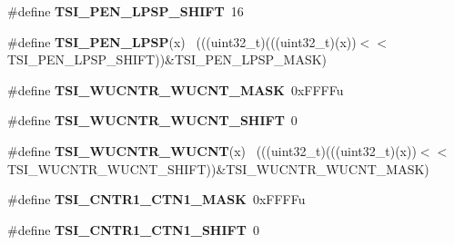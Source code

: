 \begin{DoxyCompactItemize}
\item 
\hypertarget{group___t_s_i___register___masks_ga8a4314c8664c97a0304050452d85779b}{}\#define {\bfseries T\+S\+I\+\_\+\+P\+E\+N\+\_\+\+L\+P\+S\+P\+\_\+\+S\+H\+I\+F\+T}~16\label{group___t_s_i___register___masks_ga8a4314c8664c97a0304050452d85779b}

\item 
\hypertarget{group___t_s_i___register___masks_ga2c49a1ebc890fb8e3d4e7468c516d8fd}{}\#define {\bfseries T\+S\+I\+\_\+\+P\+E\+N\+\_\+\+L\+P\+S\+P}(x)                                                ~(((uint32\+\_\+t)(((uint32\+\_\+t)(x))$<$$<$T\+S\+I\+\_\+\+P\+E\+N\+\_\+\+L\+P\+S\+P\+\_\+\+S\+H\+I\+F\+T))\&T\+S\+I\+\_\+\+P\+E\+N\+\_\+\+L\+P\+S\+P\+\_\+\+M\+A\+S\+K)\label{group___t_s_i___register___masks_ga2c49a1ebc890fb8e3d4e7468c516d8fd}

\item 
\hypertarget{group___t_s_i___register___masks_gaa12e0ab73453118119dc56599e0a5598}{}\#define {\bfseries T\+S\+I\+\_\+\+W\+U\+C\+N\+T\+R\+\_\+\+W\+U\+C\+N\+T\+\_\+\+M\+A\+S\+K}~0x\+F\+F\+F\+Fu\label{group___t_s_i___register___masks_gaa12e0ab73453118119dc56599e0a5598}

\item 
\hypertarget{group___t_s_i___register___masks_gab6de5e2e100b2608c1837b6114fb5117}{}\#define {\bfseries T\+S\+I\+\_\+\+W\+U\+C\+N\+T\+R\+\_\+\+W\+U\+C\+N\+T\+\_\+\+S\+H\+I\+F\+T}~0\label{group___t_s_i___register___masks_gab6de5e2e100b2608c1837b6114fb5117}

\item 
\hypertarget{group___t_s_i___register___masks_gabfa380c87734a1e8d767c8f743906660}{}\#define {\bfseries T\+S\+I\+\_\+\+W\+U\+C\+N\+T\+R\+\_\+\+W\+U\+C\+N\+T}(x)                                        ~(((uint32\+\_\+t)(((uint32\+\_\+t)(x))$<$$<$T\+S\+I\+\_\+\+W\+U\+C\+N\+T\+R\+\_\+\+W\+U\+C\+N\+T\+\_\+\+S\+H\+I\+F\+T))\&T\+S\+I\+\_\+\+W\+U\+C\+N\+T\+R\+\_\+\+W\+U\+C\+N\+T\+\_\+\+M\+A\+S\+K)\label{group___t_s_i___register___masks_gabfa380c87734a1e8d767c8f743906660}

\item 
\hypertarget{group___t_s_i___register___masks_ga7d2647f0e7166cd22930dc7d15726bdc}{}\#define {\bfseries T\+S\+I\+\_\+\+C\+N\+T\+R1\+\_\+\+C\+T\+N1\+\_\+\+M\+A\+S\+K}~0x\+F\+F\+F\+Fu\label{group___t_s_i___register___masks_ga7d2647f0e7166cd22930dc7d15726bdc}

\item 
\hypertarget{group___t_s_i___register___masks_ga51545c15d46b9d961b3cd8a2aed33e46}{}\#define {\bfseries T\+S\+I\+\_\+\+C\+N\+T\+R1\+\_\+\+C\+T\+N1\+\_\+\+S\+H\+I\+F\+T}~0\label{group___t_s_i___register___masks_ga51545c15d46b9d961b3cd8a2aed33e46}


\end{DoxyCompactItemize}
